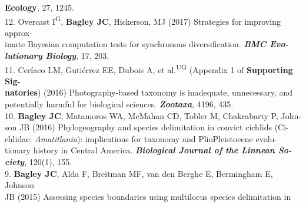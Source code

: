 \documentclass[margin,line]{res}
\begin{document}
\begin{resume}
{\hspace*{8mm}\textbf{Ecology}}, 27, 1245. \\ %
12. Overcast I\textsuperscript{G}, \textbf{Bagley JC}, Hickerson, MJ (2017) Strategies for improving approx-\\
\hspace*{8mm} imate Bayesian computation tests for synchronous diversification. {\it \textbf{BMC Evo-}\\ \vspace{2mm}
\hspace*{8mm}\textbf{lutionary Biology}}, 17, 203. \\
11. Cer\'{i}aco LM, Guti\'{e}rrez EE, Dubois A, et al.\textsuperscript{UG} (Appendix 1 of \textbf{Supporting Sig-}\\
\hspace*{8mm} \textbf{natories}) (2016) Photography-based taxonomy is inadequate, unnecessary, and\\ \vspace{2mm}
\hspace*{8mm}potentially harmful for biological sciences. {\it \textbf{Zootaxa}}, 4196, 435. \\
10. \textbf{Bagley JC}, Matamoros WA, McMahan CD, Tobler M, Chakrabarty P, John-\\
\hspace*{8mm} son JB (2016) Phylogeography and species delimitation in convict cichlids (Ci-\\
\hspace*{8mm} chlidae: \emph{Amatitlania}): implications for taxonomy and Plio\textemdash Pleistocene evolu-\\
\hspace*{8mm} tionary history in Central America. {\it \textbf{Biological Journal of the Linnean So-}\\ \vspace{2mm}
\hspace*{8mm}\textbf{ciety}}, 120(1), 155. \\
9. \textbf{Bagley JC}, Alda F, Breitman MF, van den Berghe E, Bermingham E, Johnson\\
\hspace*{8mm} JB (2015) Assessing species boundaries using multilocus species delimitation in \\

\end{resume}
\end{document}
